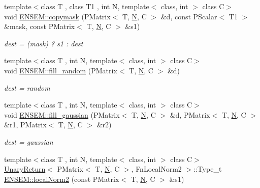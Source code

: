 \begin{DoxyCompactItemize}
{\footnotesize template$<$class T , class T1 , int N, template$<$ class, int $>$ class C$>$ }\\void \mbox{\hyperlink{group__primmatrix_ga6bebd0377eb8253b3d4ba1586d1ecdad}{E\+N\+S\+E\+M\+::copymask}} (P\+Matrix$<$ T, \mbox{\hyperlink{adat__devel_2lib_2hadron_2operator__name__util_8cc_a7722c8ecbb62d99aee7ce68b1752f337}{N}}, C $>$ \&d, const P\+Scalar$<$ T1 $>$ \&mask, const P\+Matrix$<$ T, \mbox{\hyperlink{adat__devel_2lib_2hadron_2operator__name__util_8cc_a7722c8ecbb62d99aee7ce68b1752f337}{N}}, C $>$ \&s1)
\begin{DoxyCompactList}\small\item\em dest = (mask) ? s1 \+: dest \end{DoxyCompactList}\item 
{\footnotesize template$<$class T , int N, template$<$ class, int $>$ class C$>$ }\\void \mbox{\hyperlink{group__primmatrix_gaa42f6f1f971a8fb7bf5b5b8b0a5a43ec}{E\+N\+S\+E\+M\+::fill\+\_\+random}} (P\+Matrix$<$ T, \mbox{\hyperlink{adat__devel_2lib_2hadron_2operator__name__util_8cc_a7722c8ecbb62d99aee7ce68b1752f337}{N}}, C $>$ \&d)
\begin{DoxyCompactList}\small\item\em dest = random \end{DoxyCompactList}\item 
{\footnotesize template$<$class T , int N, template$<$ class, int $>$ class C$>$ }\\void \mbox{\hyperlink{group__primmatrix_gaad23aac5e121c759d15b6153996bdf9e}{E\+N\+S\+E\+M\+::fill\+\_\+gaussian}} (P\+Matrix$<$ T, \mbox{\hyperlink{adat__devel_2lib_2hadron_2operator__name__util_8cc_a7722c8ecbb62d99aee7ce68b1752f337}{N}}, C $>$ \&d, P\+Matrix$<$ T, \mbox{\hyperlink{adat__devel_2lib_2hadron_2operator__name__util_8cc_a7722c8ecbb62d99aee7ce68b1752f337}{N}}, C $>$ \&r1, P\+Matrix$<$ T, \mbox{\hyperlink{adat__devel_2lib_2hadron_2operator__name__util_8cc_a7722c8ecbb62d99aee7ce68b1752f337}{N}}, C $>$ \&r2)
\begin{DoxyCompactList}\small\item\em dest = gaussian \end{DoxyCompactList}\item 
{\footnotesize template$<$class T , int N, template$<$ class, int $>$ class C$>$ }\\\mbox{\hyperlink{structUnaryReturn}{Unary\+Return}}$<$ P\+Matrix$<$ T, \mbox{\hyperlink{adat__devel_2lib_2hadron_2operator__name__util_8cc_a7722c8ecbb62d99aee7ce68b1752f337}{N}}, C $>$, Fn\+Local\+Norm2 $>$\+::Type\+\_\+t \mbox{\hyperlink{group__primmatrix_ga701b80e6864ced6a31a2abc314946f2f}{E\+N\+S\+E\+M\+::local\+Norm2}} (const P\+Matrix$<$ T, \mbox{\hyperlink{adat__devel_2lib_2hadron_2operator__name__util_8cc_a7722c8ecbb62d99aee7ce68b1752f337}{N}}, C $>$ \&s1)

\end{DoxyCompactItemize}
